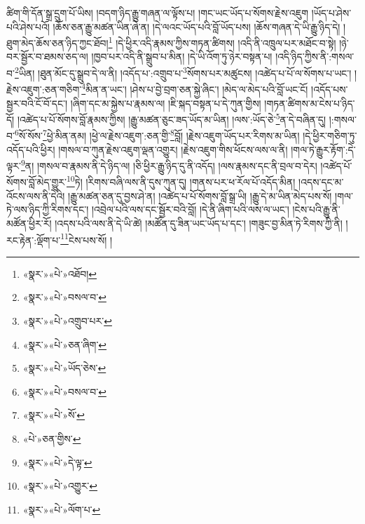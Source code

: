 ཚིག་གི་དོན་སྒྲ་དྲུག་པོ་ཡིས། །བདག་ཉིད་རྒྱུ་གཞན་ལ་ལྟོས་པ། །གང་ཡང་ཡོད་པ་སོགས་རྗེས་འཇུག །ཡོད་པ་ཤེས་པའི་ཤེས་པའོ། །ཆོས་ཅན་རྒྱུ་མཚན་ཡིན་ཞེ་ན། །དེ་ལའང་ཡོད་པའི་བློ་ཡོད་པས། །ཆོས་གཞན་དེ་ཡི་རྒྱུ་ཉིད་དེ། །ཐུག་མེད་ཆོས་ཅན་ཉིད་ཀྱང་ཐོབ།\footnote{«སྣར་»«པེ་»འཐོབ།} །དེ་ཕྱིར་འདི་རྣམས་ཀྱིས་གཏན་ཚིགས། །འདི་ནི་འཁྲུལ་པར་མཐོང་བ་སྟེ། །ཉེ་བར་སྦྱོར་བ་ཐམས་ཅད་ལ། །ཁྱབ་པར་འདི་ནི་སྒྲུབ་པ་མིན། །དེ་ཡི་འོག་ཏུ་ཉེར་བསྟན་པ། །འདི་ཉིད་ཀྱིས་ནི་:གསལ་བ་\footnote{«སྣར་»«པེ་»བསལ་བ་}ཡིན། །ཐུན་མོང་དུ་སྒྲུབ་དེ་ལ་ནི། །འདོད་པ་:འགྲུབ་པ་\footnote{«སྣར་»«པེ་»འགྲུབ་པར་}སོགས་པར་མཚུངས། །འཚེད་པ་པོ་ལ་སོགས་པ་ཡང་། །རྗེས་འཇུག་:ཅན་གཅིག་\footnote{«སྣར་»«པེ་»ཅན་ཞིག་}མིན་ན་ཡང་། །ཤེས་པ་བྱེ་བྲག་ཅན་སྐྱེ་ཞིང་། །མེད་ལ་མེད་པའི་བློ་ཡང་ངོ། །འདོད་པས་སྦྱར་བའི་ངོ་བོ་དང་། །ཞིག་དང་མ་སྐྱེས་པ་རྣམས་ལ། །ཇི་སྐད་བསྟན་པ་དེ་ཀུན་གྱིས། །གཏན་ཚིགས་མ་ངེས་པ་ཉིད་དོ། །འཚེད་པ་པོ་སོགས་བློ་རྣམས་ཀྱིས། །རྒྱུ་མཚན་ཅུང་ཟད་ཡོད་མ་ཡིན། །ལས་:ཡོད་ཅེ་\footnote{«སྣར་»«པེ་»ཡོད་ཅེས་}ན་དེ་བཞིན་དུ། །:གསལ་བ་\footnote{«སྣར་»«པེ་»བསལ་བ་}སོ་སོས་\footnote{«སྣར་»«པེ་»སོ་}ཕྱེ་མིན་ནམ། །ཕྱེ་ལ་རྗེས་འཇུག་:ཅན་གྱི་\footnote{«པེ་»ཅན་གྱིས་}བློ། །རྗེས་འཇུག་ཡོད་པར་རིགས་མ་ཡིན། །དེ་ཕྱིར་གཅིག་ཏུ་འདོད་པའི་ཕྱིར། །གསལ་བ་ཀུན་རྗེས་འཇུག་ལྡན་འགྱུར། །རྗེས་འཇུག་གིས་ཕོངས་ལས་ལ་ནི། །གལ་ཏེ་རྒྱུར་རྟོག་:དེ་ལྟར་\footnote{«སྣར་»«པེ་»དེ་ལྟ་}ན། །གསལ་བ་རྣམས་ནི་དེ་ཉིད་ལ། །ཅི་ཕྱིར་རྒྱུ་ཉིད་དུ་ནི་འདོད། །ལས་རྣམས་དང་ནི་བྲལ་བ་དེར། །འཚེད་པོ་སོགས་བློ་མེད་གྱུར་\footnote{«སྣར་»«པེ་»འགྱུར་}ཏེ། །རིགས་བཞི་ལས་ནི་དུས་ཀུན་དུ། །གནས་པར་ཕ་རོལ་པོ་འདོད་མིན། །འདས་དང་མ་འོངས་ལས་ནི་དེའི། །རྒྱུ་མཚན་ཅན་དུ་བྱས་ཤེ་ན། །འཚེད་པ་པོ་སོགས་བློ་སྒྲ་ཡི། །རྒྱུ་དེ་མ་ཡིན་མེད་པས་སོ། །གལ་ཏེ་ལས་ཉིད་ཀྱི་རིགས་དང་། །འབྲེལ་པའི་ལས་དང་སྦྱོར་བའི་བློ། །དེ་ནི་ཞིག་པའི་ལས་ལ་ཡང་། །ངེས་པའི་རྒྱུ་ནི་མཚོན་ཕྱིར་རོ། །འདས་པའི་ལས་ནི་དེ་ཡི་ཚེ། །མཚོན་དུ་ཟིན་ཡང་ཡོད་པ་དང་། །གཟུང་བྱ་མིན་ཏེ་རིགས་ཀྱི་ནི། །རང་རྟེན་:ལྡོག་པ་\footnote{«སྣར་»«པེ་»ལོག་པ་}ངེས་པས་སོ། །
